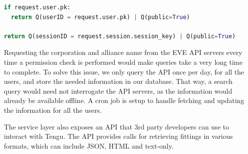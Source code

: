 \begin{lstlisting}[caption=An example of using Q objects, language=python]
if request.user.pk:
  return Q(userID = request.user.pk) | Q(public=True)

return Q(sessionID = request.session.session_key) | Q(public=True)
\end{lstlisting}

Requesting the corporation and alliance name from the EVE API servers every time a permission check is performed would make queries take a very long time to complete. To solve this issue, we only query the API once per day, for all the users, and store the needed information in our database. That way, a search query would need not interrogate the API servers, as the information would already be available offline. A cron job is setup to handle fetching and updating the information for all the users.

The service layer also exposes an API that 3rd party developers can use to interact with Tengu. The API provides calls for retrieving fittings in various formats, which can include JSON, HTML and text-only. 